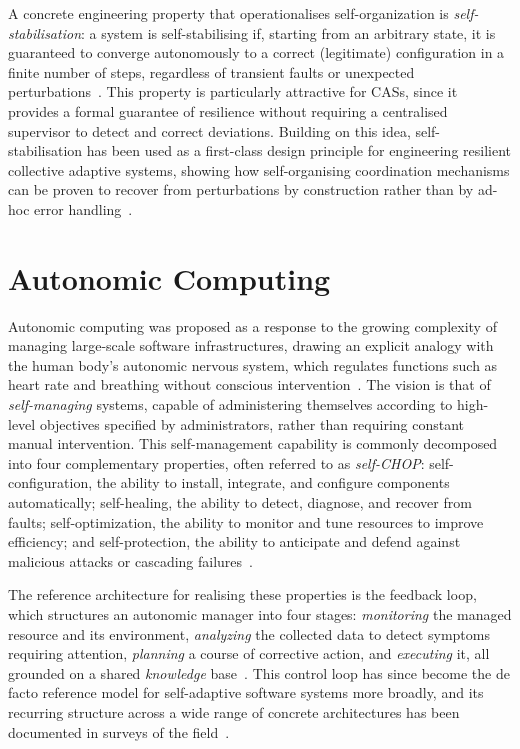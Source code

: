 A concrete engineering property that operationalises self-organization is \emph{self-stabilisation}:
a system is self-stabilising if, starting from an arbitrary state,
it is guaranteed to converge autonomously to a correct (legitimate) configuration in a finite number of steps,
regardless of transient faults or unexpected perturbations~\cite{DBLP:journals/cacm/Dijkstra74}.
%
This property is particularly attractive for \acp{CAS},
since it provides a formal guarantee of resilience
without requiring a centralised supervisor to detect and correct deviations.
%
Building on this idea,
self-stabilisation has been used as a first-class design principle
for engineering resilient collective adaptive systems,
showing how self-organising coordination mechanisms can be proven to recover from perturbations
by construction rather than by ad-hoc error handling~\cite{DBLP:journals/tomacs/ViroliABDP18}.

\section{Autonomic Computing}
\label{sec:autonomic-computing}

Autonomic computing was proposed as a response to the growing complexity of managing large-scale software infrastructures,
drawing an explicit analogy with the human body's autonomic nervous system,
which regulates functions such as heart rate and breathing without conscious intervention~\cite{DBLP:journals/computer/KephartC03}.
%
The vision is that of \emph{self-managing} systems,
capable of administering themselves according to high-level objectives specified by administrators,
rather than requiring constant manual intervention.
%
This self-management capability is commonly decomposed into four complementary properties,
often referred to as \emph{self-CHOP}:
self-configuration,
the ability to install, integrate, and configure components automatically;
self-healing,
the ability to detect, diagnose, and recover from faults;
self-optimization,
the ability to monitor and tune resources to improve efficiency;
and self-protection,
the ability to anticipate and defend against malicious attacks or cascading failures~\cite{DBLP:journals/computer/KephartC03}.

The reference architecture for realising these properties is the \mapek{} feedback loop,
which structures an autonomic manager into four stages:
\emph{monitoring} the managed resource and its environment,
\emph{analyzing} the collected data to detect symptoms requiring attention,
\emph{planning} a course of corrective action,
and \emph{executing} it,
all grounded on a shared \emph{knowledge} base~\cite{DBLP:journals/computer/KephartC03}.
%
This control loop has since become the de facto reference model for self-adaptive software systems more broadly,
and its recurring structure across a wide range of concrete architectures has been documented in surveys of the field~\cite{DBLP:journals/csur/HuebscherM08}.

